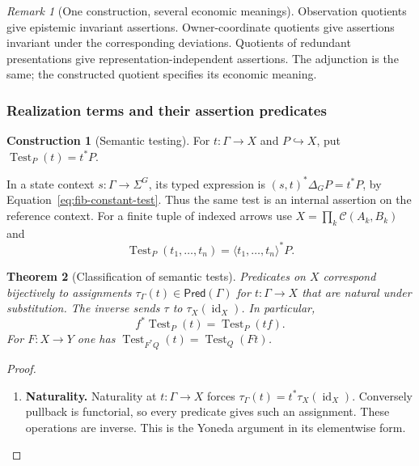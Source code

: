 \documentclass[11pt,a4paper]{article}
\numberwithin{equation}{section}
\newtheorem{theorem}{Theorem}[section]
\theoremstyle{definition}
\newtheorem{construction}[construction]{Construction}
\theoremstyle{remark}
\newtheorem{remark}[theorem]{Remark}
\theoremstyle{plain}
\begin{document}
\begin{remark}[One construction, several economic meanings]
Observation quotients give epistemic invariant assertions. Owner-coordinate
quotients give assertions invariant under the corresponding deviations.
Quotients of redundant presentations give representation-independent
assertions. The adjunction is the same; the constructed quotient specifies
its economic meaning.
\end{remark}

\subsubsection{Realization terms and their assertion predicates}
\label{sec:egt-semantic-testing}

\begin{construction}[Semantic testing]
For $t:\Gamma\to X$ and $P\hookrightarrow X$, put
$\operatorname{Test}_P(t)=t^*P$.

In a state context $s:\Gamma\to\Sigma^G$, its typed expression is
$(s,t)^*\Delta_GP=t^*P$, by Equation~\eqref{eq:fib-constant-test}.
Thus the same test is an internal assertion on the reference context. For a finite tuple of indexed arrows use
$X=\prod_k\mathcal C(A_k,B_k)$ and
\[
 \operatorname{Test}_P(t_1,\ldots,t_n)
 =\langle t_1,\ldots,t_n\rangle^*P.
\]
\end{construction}

\begin{theorem}[Classification of semantic tests]
\label{thm:egt-semantic-test-yoneda}
Predicates on $X$ correspond bijectively to assignments
$\tau_\Gamma(t)\in\mathsf{Pred}(\Gamma)$ for $t:\Gamma\to X$
that are natural under substitution.
The inverse sends $\tau$ to $\tau_X(\operatorname{id}_X)$.
In particular,
\begin{equation}\label{eq:egt-semantic-test-reindexing}
 f^*\operatorname{Test}_P(t)=\operatorname{Test}_P(tf).
\end{equation}
For $F:X\to Y$ one has
$\operatorname{Test}_{F^*Q}(t)=\operatorname{Test}_Q(Ft)$.
\end{theorem}
\begin{proof}
\leavevmode
\begin{enumerate}[label=\textup{(\arabic*)},leftmargin=*,itemsep=4pt,topsep=3pt]
  \item \textbf{Naturality.} Naturality at $t:\Gamma\to X$ forces
$\tau_\Gamma(t)=t^*\tau_X(\operatorname{id}_X)$. Conversely pullback
is functorial, so every predicate gives such an assignment. These operations
are inverse. This is the Yoneda argument in its elementwise form.
\end{enumerate}
\end{proof}
\end{document}
